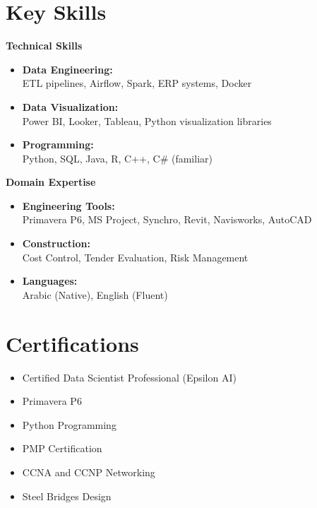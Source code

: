 \documentclass[10pt, letterpaper]{article}
\newcommand{\subsectionSpacing}{\vspace{1ex}}
\begin{document}
\section{Key Skills}
\subsectionSpacing
\begin{minipage}[t]{0.48\textwidth}
    \textbf{\textcolor{primaryColor}{Technical Skills}}
    \begin{itemize}[leftmargin=*, itemsep=0.3ex]
        \item \textbf{Data Engineering:} \\
        ETL pipelines, Airflow, Spark, ERP systems, Docker
        \item \textbf{Data Visualization:} \\
        Power BI, Looker, Tableau, Python visualization libraries
        \item \textbf{Programming:} \\
        Python, SQL, Java, R, C++, C\# (familiar)
    \end{itemize}
\end{minipage}
\hfill
\begin{minipage}[t]{0.48\textwidth}
    \textbf{\textcolor{primaryColor}{Domain Expertise}}
    \begin{itemize}[leftmargin=*, itemsep=0.3ex]
        \item \textbf{Engineering Tools:} \\
        Primavera P6, MS Project, Synchro, Revit, Navisworks, AutoCAD
        \item \textbf{Construction:} \\
        Cost Control, Tender Evaluation, Risk Management
        \item \textbf{Languages:} \\
        Arabic (Native), English (Fluent)
    \end{itemize}
\end{minipage}

\section{Certifications}
\vspace{-1ex} %
\begin{itemize}[leftmargin=*, itemsep=0.5ex] %
    \item Certified Data Scientist Professional (Epsilon AI)
    \item Primavera P6
    \item Python Programming
    \item PMP Certification
    \item CCNA and CCNP Networking
    \item Steel Bridges Design
\end{itemize}
\end{document}

